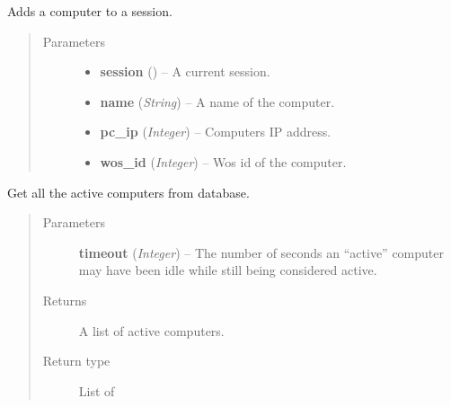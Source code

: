 \documentclass[letterpaper,10pt,english]{sphinxmanual}
\begin{document}
\begin{fulllineitems}
\label{controller:controller.computer.add_computer_to_session}
Adds a computer to a session.
\begin{quote}\begin{description}
\item[{Parameters}] \leavevmode\begin{itemize}
\item {} 
\textbf{session} ({\hyperref[models:models.Session]{}}) -- A current session.

\item {} 
\textbf{name} (\emph{String}) -- A name of the computer.

\item {} 
\textbf{pc\_ip} (\emph{Integer}) -- Computers IP address.

\item {} 
\textbf{wos\_id} (\emph{Integer}) -- Wos id of the computer.

\end{itemize}

\end{description}\end{quote}

\end{fulllineitems}


\begin{fulllineitems}
\label{controller:controller.computer.get_active_computers}
Get all the active computers from database.
\begin{quote}\begin{description}
\item[{Parameters}] \leavevmode
\textbf{timeout} (\emph{Integer}) -- The number of seconds an ``active'' computer may have been idle while
still being considered active.

\item[{Returns}] \leavevmode
A list of active computers.

\item[{Return type}] \leavevmode
List of {\hyperref[models:models.Computer]{}}

\end{description}\end{quote}

\end{fulllineitems}
\end{document}
